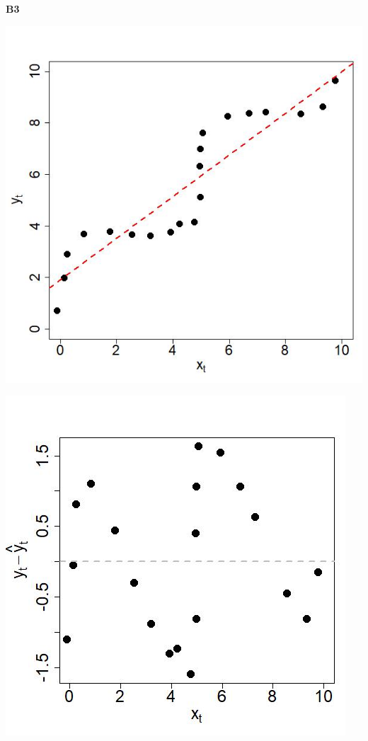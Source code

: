 \documentclass[captions=tableheading, 12pt, headings=small, parskip=half]{scrartcl}
\begin{document}
\begin{enumerate}[label = \alph*)]
{		\begin{minipage}{0.05\columnwidth}
		\begin{center}
			\Large \textbf{B3}
		\end{center}
		\end{minipage}
		\hfill
		\begin{minipage}{0.46\columnwidth}
			\includegraphics[width= \columnwidth]{Code1/B3.jpeg}
		\end{minipage}
		\hfill
		\begin{minipage}{0.46\columnwidth}
			\includegraphics[width= \columnwidth]{Code1/B3_res.jpeg}

\end{minipage}}
\end{enumerate}
\end{document}

